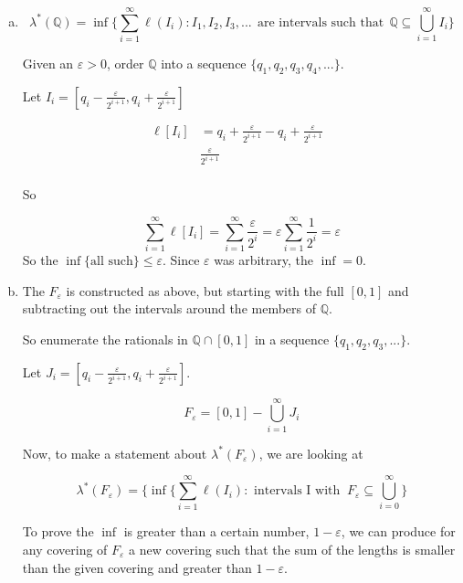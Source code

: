 \documentclass[11pt,oneside]{article}
\numberwithin{equation}{section}
\theoremstyle{definition}
\def\QQ{\mathbb{Q}}
\begin{document}
\begin{solution}
  \begin{enumerate}[(a)]
  \item
    $$
    \lambda ^* ( \QQ) = \inf \{ \sum _{i=1} ^\infty \ell ( I _ i ) : I_1, I_2, I_3, ... \ \ \text{are intervals such that} \ \ \QQ \subseteq \bigcup \limits _ {i=1} ^ \infty I_i \} 
    $$
    
    Given an $\varepsilon > 0$, order $\QQ $ into a sequence $ \{ q_1, q_2, q_3, q_4, ... \}$. 
    
    Let $I_i = [q_i - \frac{\varepsilon}{2^{i+1}},  q_i + \frac{\varepsilon}{2^{i+1}} ] $ 
    
    \begin{align*}
      \ell [ I_i ] & = q_i + \frac{\varepsilon}{2^{i+1}} - q_i +  \frac{\varepsilon}{2^{i+1}} & \\  
      &  \frac{\varepsilon}{2^{i+1}} & \\  
    \end{align*}
    
    So

    $$
    \sum \limits _ { i=1} ^ \infty \ell [I_i] =  \sum \limits _ { i=1} ^ \infty \frac{\varepsilon}{2^i} = \varepsilon \sum \limits _ {i=1} ^ \infty \frac{1}{2^i}= \varepsilon 
    $$
    So the $ \inf \{ \text{all such} \} \leq \varepsilon$.  Since $\varepsilon$ was arbitrary, the $ \inf = 0$.
    \item
      The $F_\varepsilon$ is constructed as above, but starting with the full $[0,1]$ and subtracting out the intervals around the members of $\QQ$.

      So enumerate the rationals in $ \QQ \cap [0,1]$ in a sequence $ \{ q_1, q_2, q_3, ... \}$.

      Let $J_i =  [ q_i - \frac{\varepsilon}{2^{i+1}},  q_i + \frac{\varepsilon}{2^{i+1}}]$. 
      
      $$
      F_\varepsilon = [0, 1] - \bigcup \limits _ {i = 1} ^ \infty J_i
      $$

      Now, to make a statement about $\lambda ^* (F _ \varepsilon)$, we are looking at

      $$
      \lambda ^ * (F_\varepsilon) = \{ \inf \{ \sum \limits _ { i = 1 } ^ \infty \ell ( I_i ) : \text { intervals I with } \ F_\varepsilon \subseteq \bigcup \limits _ { i = 0 } ^ \infty \}
      $$

      To prove the $\inf$ is greater than a certain number,
      $1-\varepsilon$, we can produce for any covering of
      $F_\varepsilon$ a new covering such that the sum of the lengths
      is smaller than the given covering and greater than $1 -
      \varepsilon$.
          

\end{enumerate}
\end{solution}
\end{document}
